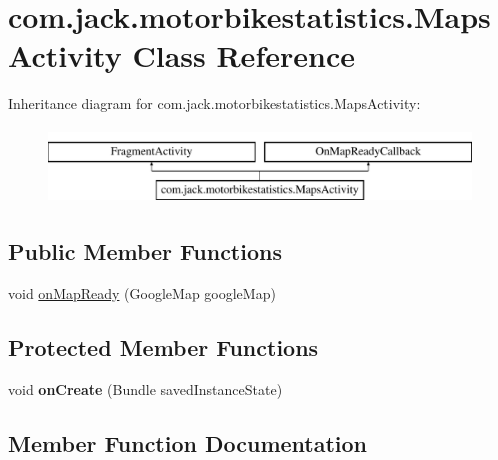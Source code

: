 \hypertarget{classcom_1_1jack_1_1motorbikestatistics_1_1_maps_activity}{}\section{com.\+jack.\+motorbikestatistics.\+Maps\+Activity Class Reference}
\label{classcom_1_1jack_1_1motorbikestatistics_1_1_maps_activity}
Inheritance diagram for com.\+jack.\+motorbikestatistics.\+Maps\+Activity\+:\begin{figure}[H]
\begin{center}
\leavevmode
\includegraphics[height=2.000000cm]{classcom_1_1jack_1_1motorbikestatistics_1_1_maps_activity}
\end{center}
\end{figure}
\subsection*{Public Member Functions}
\begin{DoxyCompactItemize}
\item 
void \hyperlink{classcom_1_1jack_1_1motorbikestatistics_1_1_maps_activity_aefa35b548b2f39bb46b2cb5024be383c}{on\+Map\+Ready} (Google\+Map google\+Map)
\end{DoxyCompactItemize}
\subsection*{Protected Member Functions}
\begin{DoxyCompactItemize}
\item 
\mbox{\label{classcom_1_1jack_1_1motorbikestatistics_1_1_maps_activity_afd23eb0cf651de276a9b85bb5fa609b8}} 
void {\bfseries on\+Create} (Bundle saved\+Instance\+State)
\end{DoxyCompactItemize}


\subsection{Member Function Documentation}
\mbox{\label{classcom_1_1jack_1_1motorbikestatistics_1_1_maps_activity_aefa35b548b2f39bb46b2cb5024be383c}} 
